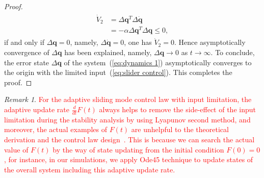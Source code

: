 \documentclass[3p]{elsarticle}
\theoremstyle{plain}
\theoremstyle{remark}
\newtheorem{myrem}{Remark}
\begin{document}
\begin{proof}
{\begin{align}
\begin{split}
\dot V_2 &= \Delta\bm q^T\Delta \dot{\bm q}\\
&=-\alpha \Delta \bm q^T\Delta \bm q\le 0,
\end{split}
\end{align}
if and only if $\Delta \bm q = 0$, namely, $\Delta \dot {\bm q} = 0$, one has $\dot V_2=0$. Hence asymptotically convergence of $\Delta \bm q$ has been explained, namely, $\Delta \bm q\rightarrow 0$ as $t\rightarrow \infty$. To conclude, the error state $\Delta \bm q$ of the system~(\ref{eq:dynamics 1}) asymptotically converges to the origin with the limited input~(\ref{eq:slider control})}. This completes the proof.
\end{proof}
\begin{myrem}
\textcolor{red}{For the adaptive sliding mode control law with input limitation, the adaptive update rate $\frac{d}{dt}F(t)$ always helps to remove the side-effect of the input limitation during the stability analysis by using Lyapunov second method, and moreover, the actual examples of $F(t)$ are unhelpful to the theoretical derivation and the control law design~\cite{Hu2008552,6060930}. This is because we can search the actual value of $F(t)$  by the way of state updating from the initial condition $F(0)=0$, for instance, in our simulations, we apply Ode45 technique to update states of the overall system including this adaptive update rate.}
\end{myrem}
\end{document}
